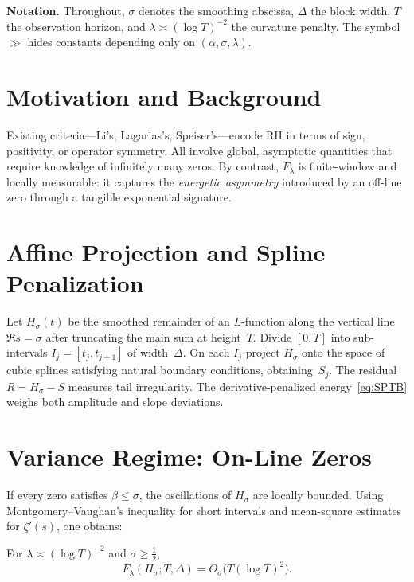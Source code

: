 \medskip
\noindent
\textbf{Notation.}
Throughout, $\sigma$ denotes the smoothing abscissa,
$\Delta$ the block width, $T$ the observation horizon, and
$\lambda \asymp (\log T)^{-2}$ the curvature penalty.
The symbol $\gg$ hides constants depending only on
$(\alpha,\sigma,\lambda)$.

\section{Motivation and Background}

Existing criteria—Li’s, Lagarias’s, Speiser’s—encode RH in terms of
sign, positivity, or operator symmetry.  
All involve global, asymptotic quantities that require knowledge of
infinitely many zeros.  
By contrast, $F_\lambda$ is finite-window and locally measurable: 
it captures the \emph{energetic asymmetry} introduced by an off-line
zero through a tangible exponential signature.

\section{Affine Projection and Spline Penalization}

Let $H_\sigma(t)$ be the smoothed remainder of an $L$-function along
the vertical line $\Re s=\sigma$ after truncating the main sum at
height~$T$.  
Divide $[0,T]$ into sub-intervals $I_j=[t_j,t_{j+1}]$ of width~$\Delta$.
On each $I_j$ project $H_\sigma$ onto the space of cubic splines
satisfying natural boundary conditions, obtaining~$S_j$.
The residual $R=H_\sigma-S$ measures tail irregularity.
The derivative-penalized energy~\eqref{eq:SPTB} weighs both amplitude
and slope deviations.

\section{Variance Regime:  On-Line Zeros}

If every zero satisfies $\beta\le\sigma$, the oscillations of
$H_\sigma$ are locally bounded.  
Using Montgomery–Vaughan’s inequality for short intervals and
mean-square estimates for $\zeta'(s)$, one obtains:

\begin{theorem}
For $\lambda\asymp(\log T)^{-2}$ and $\sigma\ge\tfrac12$,
\[
F_\lambda(H_\sigma;T,\Delta)
  =O_\sigma\!\bigl(T(\log T)^2\bigr).
\tag{4.1}
\]
\end{theorem}

